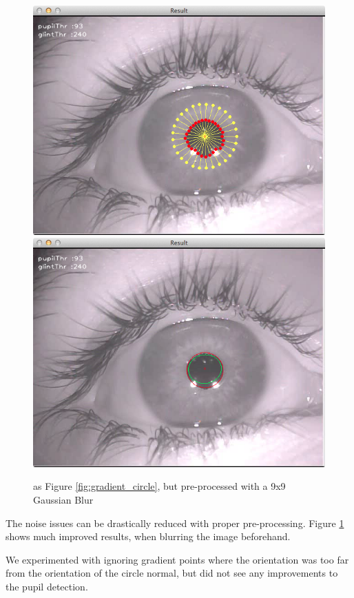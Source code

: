 \documentclass[a4paper,11pt]{article}
\begin{document}
\begin{figure}[H]
  \centering
  \includegraphics[scale=0.25]{gradient_circle_gaussian_blur}
  \includegraphics[scale=0.25]{gradient_pupil_gaussian_blur}
  \caption{as Figure \ref{fig:gradient_circle}, but pre-processed with a 9x9 Gaussian Blur}
  \label{fig:gradient_circle_gaussian_blur}
\end{figure}

The noise issues can be drastically reduced with proper pre-processing. Figure \ref{fig:gradient_circle_gaussian_blur} shows much improved results, when blurring the image beforehand.

We experimented with ignoring gradient points where the orientation was too far from the orientation of the circle normal, but did not see any improvements to the pupil detection.
\end{document}
